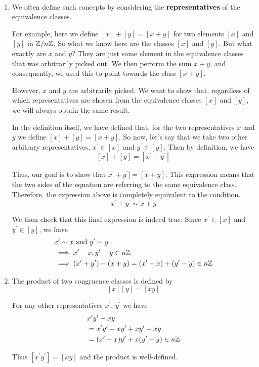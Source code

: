 \begin{solution} \
\begin{enumerate}[label=(\alph*)]
\item We often define such concepts by considering the \textbf{representatives} of the equivalence classes.

For example, here we define $[x]+[y]=[x+y]$ for two elements $[x]$ and $[y]$ in $\mathbb Z/n\mathbb Z$. So what we know here are the classes $[x]$ and $[y]$. But what exactly are $x$ and $y$? They are just some element in the equivalence classes that was arbitrarily picked out. We then perform the sum $x+y$, and consequently, we used this to point towards the class $[x+y]$. 

However, $x$ and $y$ are arbitrarily picked. We want to show that, regardless of which representatives are chosen from  the equivalence classes $[x]$ and $[y]$, we will always obtain the same result.

In the definition itself, we have defined that, for the two representatives $x$ and $y$ we define $[x]+[y]=[x+y]$. So now, let's say that we take two other arbitrary representatives, $x^\prime\in [x]$ and $y^\prime\in [y]$. 
Then by definition, we have
\[ [x]+[y]=[x^\prime+y^\prime] \]

Thus, our goal is to show that $x^\prime+y^\prime]=[x+y]$. 
This expression means that the two sides of the equation are referring to the same equivalence class.
Therefore, the expression above is completely equivalent to the condition.
\[ x^\prime+y^\prime \sim x+y \]

We then check that this final expression is indeed true:
Since $x^\prime\in [x]$ and $y^\prime\in [y]$, we have 
\begin{align*}
&x^\prime\sim x \text{ and } y^\prime\sim y \\
&\implies x^\prime-x, y^\prime-y\in n\mathbb Z \\
&\implies (x^\prime+y^\prime)-(x+y)=(x^\prime-x)+(y^\prime-y)\in n\mathbb Z
\end{align*}

\item The product of two congruence classes is defined by
\[ [x][y]=[xy] \]

For any other representatives $x^\prime$, $y^\prime$ we have
\begin{align*}
&x^\prime y^\prime-xy \\
&=x^\prime y^\prime-xy^\prime+xy^\prime-xy \\
&=(x^\prime-x)y^\prime+x(y^\prime-y) \in n\mathbb Z
\end{align*}

Thus $[x^\prime y^\prime]=[xy]$ and the product is well-defined.
\end{enumerate}
\end{solution}
\pagebreak

